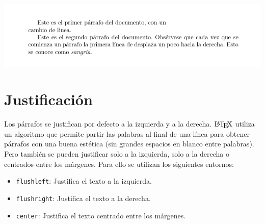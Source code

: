 \documentclass[
  a4paper,
]{scrreport}
\providecommand{\tightlist}{%
  \setlength{\itemsep}{0pt}\setlength{\parskip}{0pt}}\usepackage{longtable,booktabs,array}
\begin{document}
\begin{tcolorbox}[enhanced jigsaw, bottomrule=.15mm, leftrule=.75mm, opacityback=0, titlerule=0mm, bottomtitle=1mm, colbacktitle=quarto-callout-note-color!10!white, arc=.35mm, toprule=.15mm, colframe=quarto-callout-note-color-frame, title={Salida}, coltitle=black, colback=white, breakable, toptitle=1mm, rightrule=.15mm, left=2mm, opacitybacktitle=0.6]

\includegraphics{./img/secciones/parrafos.png}

\end{tcolorbox}

\hypertarget{justificaciuxf3n}{%
\section{Justificación}\label{justificaciuxf3n}}

Los párrafos se justifican por defecto a la izquierda y a la derecha.
\(\text{\LaTeX}\) utiliza un algoritmo que permite partir las palabras
al final de una línea para obtener párrafos con una buena estética (sin
grandes espacios en blanco entre palabras). Pero también se pueden
justificar solo a la izquierda, solo a la derecha o centrados entre los
márgenes. Para ello se utilizan los siguientes entornos:

\begin{itemize}
\tightlist
\item
  \texttt{flushleft}: Justifica el texto a la izquierda.
\item
  \texttt{flushright}: Justifica el texto a la derecha.
\item
  \texttt{center}: Justifica el texto centrado entre los márgenes.
\end{itemize}
\end{document}

